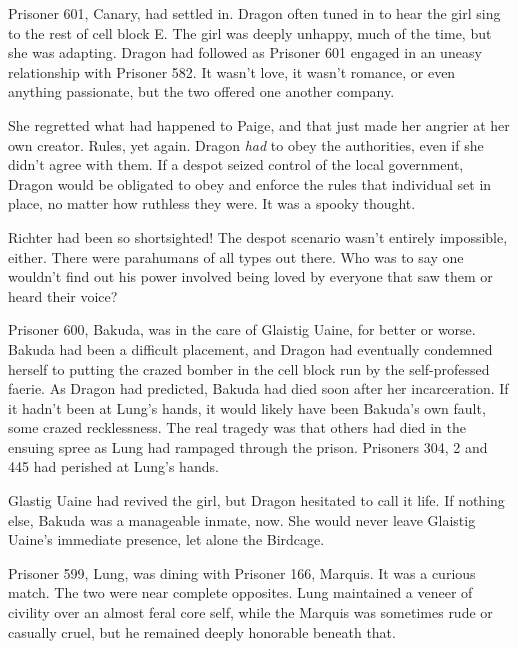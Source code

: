 Prisoner 601, Canary, had settled in.  Dragon often tuned in to hear the girl sing to the rest of cell block E.  The girl was deeply unhappy, much of the time, but she was adapting.  Dragon had followed as Prisoner 601 engaged in an uneasy relationship with Prisoner 582.  It wasn't love, it wasn't romance, or even anything passionate, but the two offered one another company.



She regretted what had happened to Paige, and that just made her angrier at her own creator.  Rules, yet again.  Dragon \emph{had} to obey the authorities, even if she didn't agree with them.  If a despot seized control of the local government, Dragon would be obligated to obey and enforce the rules that individual set in place, no matter how ruthless they were.  It was a spooky thought.



Richter had been so shortsighted!  The despot scenario wasn't entirely impossible, either.  There were parahumans of all types out there.  Who was to say one wouldn't find out his power involved being loved by everyone that saw them or heard their voice?



Prisoner 600, Bakuda, was in the care of Glaistig Uaine, for better or worse.  Bakuda had been a difficult placement, and Dragon had eventually condemned herself to putting the crazed bomber in the cell block run by the self-professed faerie.  As Dragon had predicted, Bakuda had died soon after her incarceration.  If it hadn't been at Lung's hands, it would likely have been Bakuda's own fault, some crazed recklessness.  The real tragedy was that others had died in the ensuing spree as Lung had rampaged through the prison.  Prisoners 304, 2 and 445 had perished at Lung's hands.



Glastig Uaine had revived the girl, but Dragon hesitated to call it life.  If nothing else, Bakuda was a manageable inmate, now.  She would never leave Glaistig Uaine's immediate presence, let alone the Birdcage.



Prisoner 599, Lung, was dining with Prisoner 166, Marquis.  It was a curious match.  The two were near complete opposites.  Lung maintained a veneer of civility over an almost feral core self, while the Marquis was sometimes rude or casually cruel, but he remained deeply honorable beneath that.



